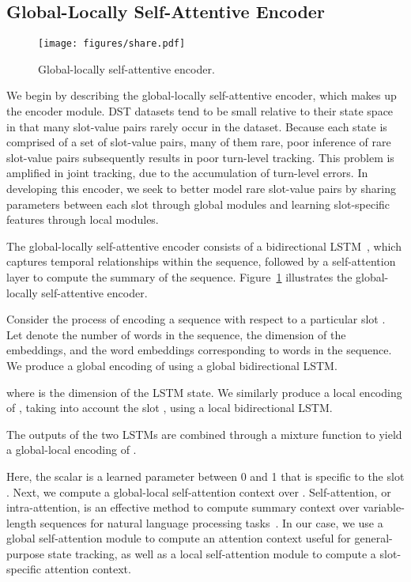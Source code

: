 \documentclass[11pt,a4paper]{article}
\begin{document}
\subsection{Global-Locally Self-Attentive Encoder}


\begin{figure}[t]
\centering
\texttt{[image: figures/share.pdf]}
\caption{
Global-locally self-attentive encoder.
}
\label{fig:share}
\end{figure}





We begin by describing the global-locally self-attentive encoder, which makes up the encoder module.
DST datasets tend to be small relative to their state space in that many slot-value pairs rarely occur in the dataset.
Because each state is comprised of a set of slot-value pairs, many of them rare, poor inference of rare slot-value pairs subsequently results in poor turn-level tracking.
This problem is amplified in joint tracking, due to the accumulation of turn-level errors.
In developing this encoder, we seek to better model rare slot-value pairs by sharing parameters between each slot through global modules and learning slot-specific features through local modules.

The global-locally self-attentive encoder consists of a bidirectional LSTM~\citep{Hochreiter1997Long}, which captures temporal relationships within the sequence, followed by a self-attention layer to compute the summary of the sequence.
Figure~\ref{fig:share} illustrates the global-locally self-attentive encoder.

Consider the process of encoding a sequence with respect to a particular slot .
Let  denote the number of words in the sequence,  the dimension of the embeddings, and  the word embeddings corresponding to words in the sequence.
We produce a global encoding  of  using a global bidirectional LSTM.



where  is the dimension of the LSTM state.
We similarly produce a local encoding  of , taking into account the slot , using a local bidirectional LSTM.



The outputs of the two LSTMs are combined through a mixture function to yield a global-local encoding  of . 



Here, the scalar  is a learned parameter between 0 and 1 that is specific to the slot .
Next, we compute a global-local self-attention context  over .
Self-attention, or intra-attention, is an effective method to compute summary context over variable-length sequences for natural language processing tasks~\citep{cheng2016long,Vaswani2017attention,he2017deep,lee2017end}.
In our case, we use a global self-attention module to compute an attention context useful for general-purpose state tracking, as well as a local self-attention module to compute a slot-specific attention context.
\end{document}
